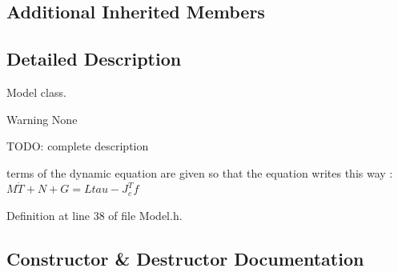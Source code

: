 \subsection*{Additional Inherited Members}


\subsection{Detailed Description}
Model class. 

\begin{DoxyWarning}{Warning}
None
\end{DoxyWarning}
T\+O\+DO\+: complete description

terms of the dynamic equation are given so that the equation writes this way \+: $ M\dot{T} + N + G = L tau - J_c^T f $ 

Definition at line 38 of file Model.\+h.



\subsection{Constructor \& Destructor Documentation}
